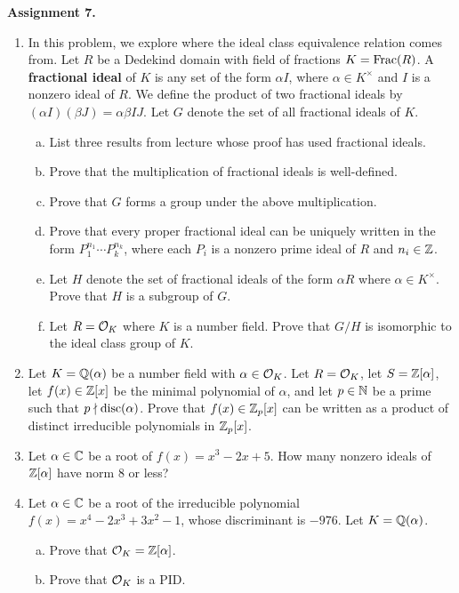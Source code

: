 {\bf Assignment 7.} 
\begin{enumerate}[leftmargin=1.5cm, label={{\bf A7-\arabic*}}]
    \item \label{A7-1} In this problem, we explore where the ideal class 
    equivalence relation comes from. Let $R$ be a Dedekind domain with 
    field of fractions $K = \operatorname{Frac}(R)$. A {\bf fractional ideal} of 
    $K$ is any set of the form $\alpha I$, where $\alpha \in K^\times$ and 
    $I$ is a nonzero ideal of $R$. We define the product of two fractional 
    ideals by $(\alpha I)(\beta J) = \alpha\beta IJ$. Let $G$ denote 
    the set of all fractional ideals of $K$. 
    \begin{enumerate}[(a)]
        \item List three results from lecture whose proof has used 
        fractional ideals. 
        \item Prove that the multiplication of fractional ideals is well-defined. 
        \item Prove that $G$ forms a group under the above multiplication.
        \item Prove that every proper fractional ideal can be uniquely written 
        in the form $P_1^{n_1} \cdots P_k^{n_k}$, where each $P_i$ is a nonzero 
        prime ideal of $R$ and $n_i \in \mathbb{Z}$. 
        \item Let $H$ denote the set of fractional ideals of the form 
        $\alpha R$ where $\alpha \in K^\times$. Prove that $H$ is a subgroup of $G$. 
        \item Let $R = {\cal O}_K$ where $K$ is a number field. Prove that 
        $G/H$ is isomorphic to the ideal class group of $K$.
    \end{enumerate}
    \item \label{A7-2} Let $K = \mathbb{Q}(\alpha)$ be a number field with $\alpha \in {\cal O}_K$. 
    Let $R = {\cal O}_K$, let $S = \mathbb{Z}[\alpha]$, let $f(x) \in \mathbb{Z}[x]$ be the minimal 
    polynomial of $\alpha$, and let $p \in \mathbb{N}$ be a prime such that 
    $p \nmid \operatorname{disc}(\alpha)$. Prove that $f(x) \in \mathbb{Z}_p[x]$ can be written 
    as a product of distinct irreducible polynomials in $\mathbb{Z}_p[x]$.
    \item \label{A7-3} Let $\alpha \in \mathbb{C}$ be a root of $f(x) = x^3 - 2x + 5$. 
    How many nonzero ideals of $\mathbb{Z}[\alpha]$ have norm $8$ or less?
    \item \label{A7-4} Let $\alpha \in \mathbb{C}$ be a root of the irreducible 
    polynomial $f(x) = x^4 - 2x^3 + 3x^2 - 1$, whose discriminant is $-976$. 
    Let $K = \mathbb{Q}(\alpha)$. 
    \begin{enumerate}[(a)]
        \item Prove that ${\cal O}_K = \mathbb{Z}[\alpha]$. 
        \item Prove that ${\cal O}_K$ is a PID. 
    \end{enumerate}
\end{enumerate}

